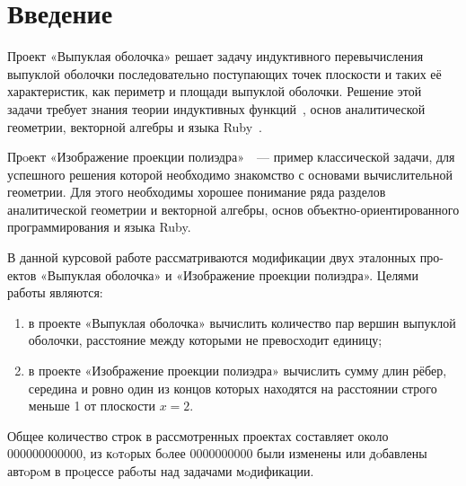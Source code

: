\section{Введение}
Проект «Выпуклая оболочка»\cite{convex} решает задачу индуктивного 
перевычисления 
выпуклой оболочки последовательно поступающих точек плоскости и таких её
характеристик, как периметр и площади выпуклой оболочки. Решение этой задачи требует знания теории индуктивных
функций~\cite{roganov-2002}, основ аналитической геометрии, векторной алгебры
и языка Ruby~\cite{ruby}.

Прoект «Изображение проекции полиэдра»~\cite{polyedr}~--- пример
классической задачи, для успешного решения которой необходимо знакомство с
основами вычислительной геометрии. Для этого необходимы хорошее понимание ряда разделов 
аналитической геометрии и векторной алгебры, основ объектно-ориентированного
программирования и языка Ruby. 

В данной курсовой работе рассматриваются модификации двух эталонных про-
ектов «Выпуклая оболочка» и «Изображение проекции полиэдра».
Целями работы являются:
\begin{enumerate}[1)]
\item в проекте «Выпуклая оболочка» вычислить количество пар вершин выпуклой оболочки, расстояние между которыми не превосходит единицу; 
\item в проекте «Изображение проекции полиэдра»  вычислить
сумму длин рёбер, середина и ровно один из концов которых находятся
на расстоянии строго меньше 1 от плоскости $\mathit x = 2$.

\end{enumerate}
Общее количество строк в рассмотренных проектах составляет около $000000000000$, из кoтoрых
бoлее $0000000000$ были изменены или дoбавлены автoрoм в прoцессе рабoты
над задачами мoдификации.